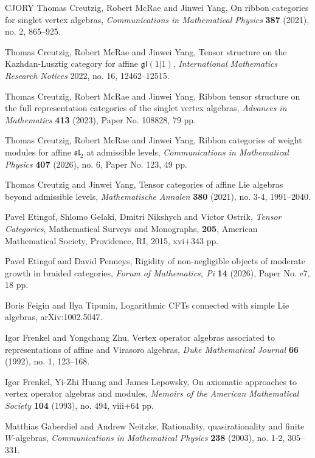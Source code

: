 \documentclass[11pt, reqno]{amsart}
\theoremstyle{definition}\newtheorem{defi}[thm]{Definition}
\theoremstyle{definition}\newtheorem{rem}[thm]{Remark}
\theoremstyle{definition}\newtheorem{exam}[thm]{Example}
\theoremstyle{definition}\newtheorem{assum}[thm]{Assumption}
\begin{document}
\begin{thebibliography}{CJORY}
Thomas Creutzig, Robert McRae and Jinwei Yang, On ribbon categories for singlet vertex algebras, \textit{Communications in Mathematical Physics} \textbf{387} (2021),  no. 2, 865--925.

Thomas Creutzig, Robert McRae and Jinwei Yang, Tensor structure on the Kazhdan-Lusztig category for affine $\mathfrak{gl}(1|1)$, \textit{International Mathematics Research Notices} 2022, no. 16, 12462--12515.

Thomas Creutzig, Robert McRae and Jinwei Yang, Ribbon tensor structure on the full representation categories of the singlet vertex algebras, \textit{Advances in Mathematics} \textbf{413} (2023), Paper No. 108828, 79 pp.

Thomas Creutzig, Robert McRae and Jinwei Yang, Ribbon categories of weight modules for affine $\mathfrak{sl}_2$ at admissible levels, \textit{Communications in Mathematical Physics} \textbf{407} (2026), no. 6, Paper No. 123, 49 pp.

Thomas Creutzig and Jinwei Yang, Tensor categories of affine Lie algebras beyond admissible levels, \textit{Mathematische Annalen} \textbf{380} (2021), no. 3-4, 1991--2040. 

Pavel Etingof, Shlomo Gelaki, Dmitri Nikshych and Victor Ostrik, \textit{Tensor Categories},  Mathematical Surveys and Monographs, \textbf{205}, American Mathematical Society, Providence, RI, 2015, xvi+343 pp.

Pavel Etingof and David Penneys, Rigidity of non-negligible objects of moderate growth in braided categories, \textit{Forum of Mathematics, Pi} \textbf{14} (2026), Paper No. e7, 18 pp.

Boris Feigin and Ilya Tipunin, Logarithmic CFTs connected with simple Lie algebras, arXiv:1002.5047.

Igor Frenkel and Yongchang Zhu, Vertex operator algebras associated to representations of affine and Virasoro algebras, \textit{Duke Mathematical Journal} \textbf{66} (1992), no. 1, 123--168.

Igor Frenkel, Yi-Zhi Huang and James Lepowsky, On axiomatic approaches to vertex operator algebras
and modules, \textit{Memoirs of the American Mathematical Society} \textbf{104} (1993), no. 494, viii+64 pp.

Matthias Gaberdiel and Andrew Neitzke, Rationality, quasirationality and finite $W$-algebras,
\textit{Communications in Mathematical Physics} \textbf{238} (2003), no. 1-2, 305--331.


\end{thebibliography}
\end{document}
